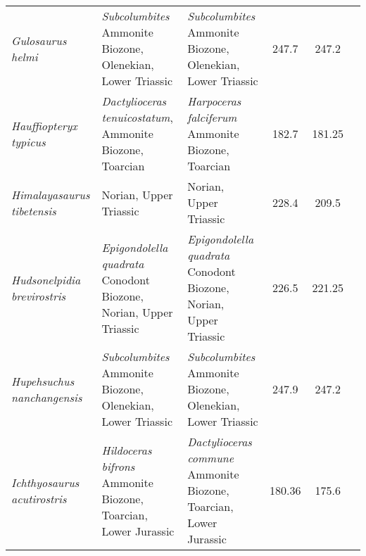 \begin{longtabu}{>{\itshape}lXXSSl}
	Gulosaurus helmi                                     & \emph{Subcolumbites} Ammonite Biozone, Olenekian, Lower Triassic                                                                   & \emph{Subcolumbites} Ammonite Biozone, Olenekian, Lower Triassic                                                                   & 247.7                    & 247.2                    & \cite{Brinkman1992,Cuthbertson2013a} \\  
	Hauffiopteryx typicus                                & \emph{Dactylioceras tenuicostatum}, Ammonite Biozone, Toarcian                                                                     & \emph{Harpoceras falciferum} Ammonite Biozone, Toarcian                                                                            & 182.7                    & 181.25                   & \cite{Maisch2008b,Caine2011,Marek2015} \\
	Himalayasaurus tibetensis                            & Norian, Upper Triassic                                                                                                             & Norian, Upper Triassic                                                                                                             & 228.4                    & 209.5                    & \cite{Motani1999a} \\                    
	Hudsonelpidia brevirostris                           & \emph{Epigondolella quadrata} Conodont Biozone, Norian, Upper Triassic                                                             & \emph{Epigondolella quadrata} Conodont Biozone, Norian, Upper Triassic                                                             & 226.5                    & 221.25                   & \cite{McGowan1995} \\                    
	Hupehsuchus nanchangensis                            & \emph{Subcolumbites} Ammonite Biozone, Olenekian, Lower Triassic                                                                   & \emph{Subcolumbites} Ammonite Biozone, Olenekian, Lower Triassic                                                                   & 247.9                    & 247.2                    & \cite{Carroll1991} \\                    
	Ichthyosaurus acutirostris                           & \emph{Hildoceras bifrons} Ammonite Biozone, Toarcian, Lower Jurassic                                                               & \emph{Dactylioceras commune} Ammonite Biozone, Toarcian, Lower Jurassic                                                            & 180.36                   & 175.6                    & \cite{McGowan2003} \\                    

\end{longtabu}
